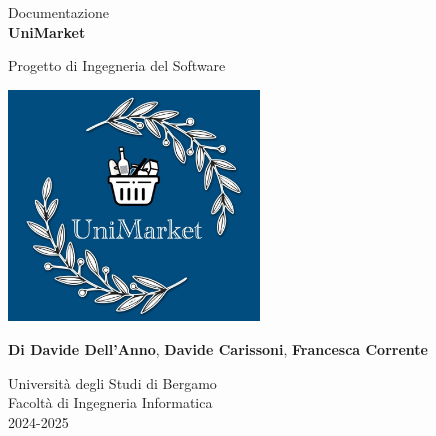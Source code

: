 \documentclass[a4paper,12pt]{article}
\begin{document}
\begin{titlepage}
    \centering
    \vspace*{2cm}
    
    \vspace{1.5cm}
    
    \large Documentazione\\
    \Huge
    \textbf{UniMarket}
    
    \vspace{1.5cm}
    
    \LARGE
    Progetto di Ingegneria del Software
    
    \vspace{1.5cm}
    \includegraphics[width=0.5\textwidth]{../Media/logo.jpeg}
    
    \vspace{1.5cm}
    \small
    \textbf{Di Davide Dell'Anno}, \textbf{Davide Carissoni}, \textbf{Francesca Corrente}
    
    \vspace{1.5cm}
    
    \Large
    Università degli Studi di Bergamo \\
    Facoltà di Ingegneria Informatica \\
    2024-2025
    
\end{titlepage}

\renewcommand{\contentsname}{Indice}
\newpage
\tableofcontents
\newpage

\end{document}
